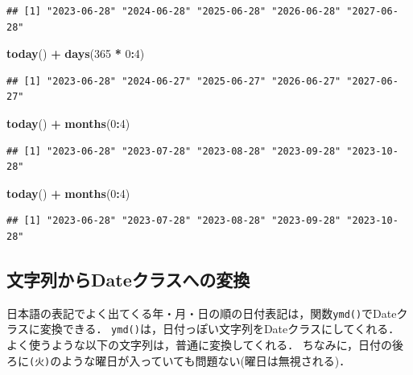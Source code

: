 \documentclass[
]{article}
\newenvironment{Shaded}{\begin{snugshade}}{\end{snugshade}}
\newcommand{\DecValTok}[1]{\textcolor[rgb]{0.00,0.00,0.81}{#1}}
\newcommand{\FunctionTok}[1]{\textcolor[rgb]{0.13,0.29,0.53}{\textbf{#1}}}
\newcommand{\NormalTok}[1]{#1}
\newcommand{\SpecialCharTok}[1]{\textcolor[rgb]{0.81,0.36,0.00}{\textbf{#1}}}
\begin{document}
\begin{verbatim}
## [1] "2023-06-28" "2024-06-28" "2025-06-28" "2026-06-28" "2027-06-28"
\end{verbatim}

\begin{Shaded}
\begin{Highlighting}[]
\FunctionTok{today}\NormalTok{() }\SpecialCharTok{+} \FunctionTok{days}\NormalTok{(}\DecValTok{365} \SpecialCharTok{*} \DecValTok{0}\SpecialCharTok{:}\DecValTok{4}\NormalTok{)}
\end{Highlighting}
\end{Shaded}

\begin{verbatim}
## [1] "2023-06-28" "2024-06-27" "2025-06-27" "2026-06-27" "2027-06-27"
\end{verbatim}

\begin{Shaded}
\begin{Highlighting}[]
\FunctionTok{today}\NormalTok{() }\SpecialCharTok{+} \FunctionTok{months}\NormalTok{(}\DecValTok{0}\SpecialCharTok{:}\DecValTok{4}\NormalTok{)}
\end{Highlighting}
\end{Shaded}

\begin{verbatim}
## [1] "2023-06-28" "2023-07-28" "2023-08-28" "2023-09-28" "2023-10-28"
\end{verbatim}

\begin{Shaded}
\begin{Highlighting}[]
\FunctionTok{today}\NormalTok{() }\SpecialCharTok{+} \FunctionTok{months}\NormalTok{(}\DecValTok{0}\SpecialCharTok{:}\DecValTok{4}\NormalTok{)}
\end{Highlighting}
\end{Shaded}

\begin{verbatim}
## [1] "2023-06-28" "2023-07-28" "2023-08-28" "2023-09-28" "2023-10-28"
\end{verbatim}

\hypertarget{ux6587ux5b57ux5217ux304bux3089dateux30afux30e9ux30b9ux3078ux306eux5909ux63db}{%
\subsection{文字列からDateクラスへの変換}\label{ux6587ux5b57ux5217ux304bux3089dateux30afux30e9ux30b9ux3078ux306eux5909ux63db}}

日本語の表記でよく出てくる年・月・日の順の日付表記は，関数\texttt{ymd()}でDateクラスに変換できる．
\texttt{ymd()}は，日付っぽい文字列をDateクラスにしてくれる．
よく使うような以下の文字列は，普通に変換してくれる．
ちなみに，日付の後ろに\texttt{(火)}のような曜日が入っていても問題ない(曜日は無視される)．
\end{document}
